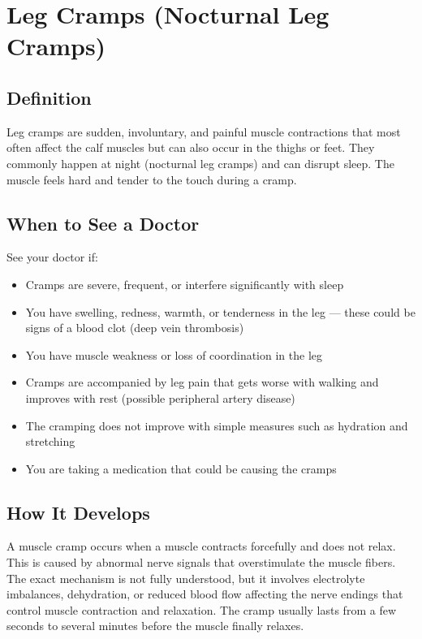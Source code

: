 \chapter{Leg Cramps (Nocturnal Leg Cramps)}

\section*{Definition}
Leg cramps are sudden, involuntary, and painful muscle contractions that most often affect the calf muscles but can also occur in the thighs or feet. They commonly happen at night (nocturnal leg cramps) and can disrupt sleep. The muscle feels hard and tender to the touch during a cramp.

\section*{When to See a Doctor}
See your doctor if:
\begin{itemize}
  \item Cramps are severe, frequent, or interfere significantly with sleep
  \item You have swelling, redness, warmth, or tenderness in the leg — these could be signs of a blood clot (deep vein thrombosis)
  \item You have muscle weakness or loss of coordination in the leg
  \item Cramps are accompanied by leg pain that gets worse with walking and improves with rest (possible peripheral artery disease)
  \item The cramping does not improve with simple measures such as hydration and stretching
  \item You are taking a medication that could be causing the cramps
\end{itemize}

\section*{How It Develops}
A muscle cramp occurs when a muscle contracts forcefully and does not relax. This is caused by abnormal nerve signals that overstimulate the muscle fibers. The exact mechanism is not fully understood, but it involves electrolyte imbalances, dehydration, or reduced blood flow affecting the nerve endings that control muscle contraction and relaxation. The cramp usually lasts from a few seconds to several minutes before the muscle finally relaxes.

